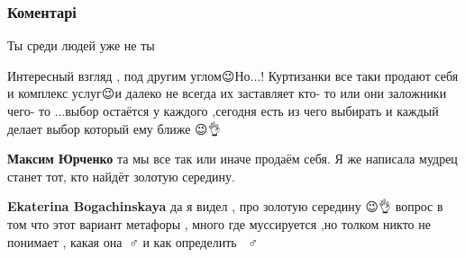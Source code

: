  
 
 
 
 
\subsubsection{Коментарі}
\label{sec:21_07_2020.fb.bogachinskaja_ekaterina.odessa.1.geroj_mudrec.cmt}

\begin{itemize}
 
Ты среди людей уже не ты

 

Интересный взгляд , под другим углом😉Но...! Куртизанки все таки продают себя и
комплекс услуг😉и далеко не всегда их заставляет кто- то или они заложники
чего- то ...выбор остаётся у каждого ,сегодня есть из чего выбирать и каждый
делает выбор который ему ближе 😉👌

\begin{itemize}
 
\textbf{Максим Юрченко} та мы все так или иначе продаём себя. Я же написала мудрец станет тот, кто найдёт золотую середину.

 
\textbf{Ekaterina Bogachinskaya} да я видел , про золотую середину 😉👌 вопрос в том что этот вариант метафоры , много где муссируется ,но толком никто не понимает , какая она🤷🏻♂️ и как определить 🤷🏻♂️


\end{itemize}
\end{itemize}
